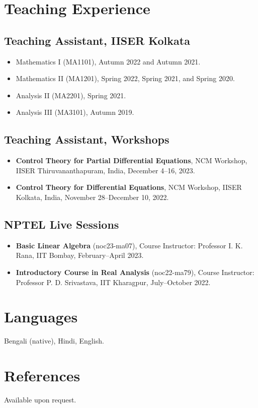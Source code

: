 \documentclass[10pt,a4paper]{article}
\begin{document}
\section*{Teaching Experience}
\subsection*{Teaching Assistant, IISER Kolkata}
\begin{itemize}
    \item Mathematics I (MA1101), Autumn 2022 and Autumn 2021.
    \item Mathematics II (MA1201), Spring 2022, Spring 2021, and Spring 2020.
    \item Analysis II (MA2201), Spring 2021.
    \item Analysis III (MA3101), Autumn 2019.
\end{itemize}

\subsection*{Teaching Assistant, Workshops}
\begin{itemize}
    \item \textbf{Control Theory for Partial Differential Equations}, NCM Workshop, IISER Thiruvananthapuram, India, December 4--16, 2023.
    \item \textbf{Control Theory for Differential Equations}, NCM Workshop, IISER Kolkata, India, November 28--December 10, 2022.
\end{itemize}

\subsection*{NPTEL Live Sessions}
\begin{itemize}
    \item \textbf{Basic Linear Algebra} (noc23-ma07), Course Instructor: Professor I. K. Rana, IIT Bombay, February--April 2023.
    \item \textbf{Introductory Course in Real Analysis} (noc22-ma79), Course Instructor: Professor P. D. Srivastava, IIT Kharagpur, July--October 2022.
\end{itemize}

\section*{Languages}
Bengali (native), Hindi, English.

\section*{References}
Available upon request.
\end{document}
